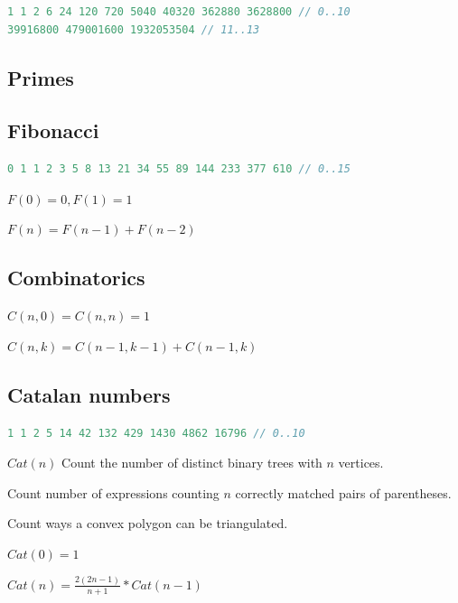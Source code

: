 \documentclass[a4paper,landscape,8pt]{article}
\begin{document}
\begin{multicols}{2}
\begin{lstlisting}[language=C++]
1 1 2 6 24 120 720 5040 40320 362880 3628800 // 0..10
39916800 479001600 1932053504 // 11..13
\end{lstlisting}

\subsection{Primes}



\subsection{Fibonacci}

\begin{lstlisting}[language=C++]
0 1 1 2 3 5 8 13 21 34 55 89 144 233 377 610 // 0..15
\end{lstlisting}

$F(0) = 0, F(1) = 1$

$F(n) = F(n - 1) + F(n - 2)$

\subsection{Combinatorics}

$C(n,0) = C(n,n) = 1$

$C(n,k) = C(n - 1, k - 1) + C(n - 1, k)$

\subsection{Catalan numbers}

\begin{lstlisting}[language=C++]
1 1 2 5 14 42 132 429 1430 4862 16796 // 0..10
\end{lstlisting}

\begin{enumerate*}
    \item $Cat(n)$ Count the number of distinct binary trees with $n$ vertices.
    \item Count number of expressions counting $n$ correctly matched pairs of parentheses.
    \item Count ways a convex polygon can be triangulated.
\end{enumerate*}

$Cat(0) = 1$

$Cat(n) = \frac{2(2n - 1)}{n + 1} * Cat(n - 1)$


\end{multicols}
\end{document}
